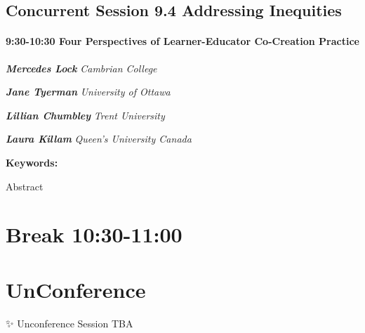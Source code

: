 \documentclass[
]{book}
\begin{document}
\hypertarget{concurrent-session-9.4-addressing-inequities}{%
\subsection*{Concurrent Session 9.4 \textbar{} Addressing Inequities}\label{concurrent-session-9.4-addressing-inequities}}

\begin{session}
\hypertarget{four-perspectives-of-learner-educator-co-creation-practice}{%
\paragraph*{\texorpdfstring{9:30-10:30 \textbar{} \textbf{Four
Perspectives of Learner-Educator Co-Creation} \textbar{}
Practice}{9:30-10:30 \textbar{} Four Perspectives of Learner-Educator Co-Creation \textbar{} Practice}}\label{four-perspectives-of-learner-educator-co-creation-practice}}

\textbf{\emph{Mercedes Lock}} \textbar{} \emph{Cambrian College}

\textbf{\emph{Jane Tyerman}} \textbar{} \emph{University of Ottawa}

\textbf{\emph{Lillian Chumbley}} \textbar{} \emph{Trent University}

\textbf{\emph{Laura Killam}} \textbar{} \emph{Queen's University Canada}

\textbf{Keywords:}

Abstract
\end{session}

\hypertarget{break-1030-1100-1}{%
\section*{Break \textbar{} 10:30-11:00}\label{break-1030-1100-1}}

\hypertarget{unconference}{%
\section{\texorpdfstring{\textbf{UnConference}}{UnConference}}\label{unconference}}

\begin{protip}
✨ Unconference Session TBA
\end{protip}
\end{document}
